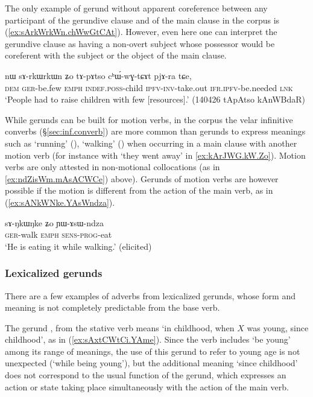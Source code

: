 The only example of gerund without apparent coreference between any participant of the gerundive clause and of the main clause in the corpus is (\ref{ex:sArkWrkWn.chWwGtCAt}). However, even here one can interpret the gerundive clause as having a non-overt subject whose possessor would be coreferent with the subject or the object of the main clause.

\begin{exe}
\ex \label{ex:sArkWrkWn.chWwGtCAt}
\gll nɯ sɤ-rkɯ\redp{}rkɯn ʑo tɤ-pɤtso cʰɯ́-wɣ-tɕɤt pjɤ-ra tɕe, \\
\textsc{dem} \textsc{ger}-be.few \textsc{emph} \textsc{indef}.\textsc{poss}-child \textsc{ipfv}-\textsc{inv}-take.out \textsc{ifr}.\textsc{ipfv}-be.needed \textsc{lnk} \\ 
\glt `People had to raise children with few [resources].' (140426 tApAtso kAnWBdaR)
\end{exe}

While gerunds can be built for motion verbs, in the corpus the velar infinitive converbs  (§\ref{sec:inf.converb}) are more common than gerunds to express meanings such as `running' (), `walking' () when occurring in a main clause with another motion verb (for instance with  `they went away' in \ref{ex:kArJWG.kW.Zo}). Motion verbs are only attested in non-motional collocations (as in \ref{ex:ndZisWm.mAsACWCe}) above). Gerunds of motion verbs are however possible if the motion is different from the action of the main verb, as in (\ref{ex:sANkWNke.YAsWndza}).

\begin{exe}
\ex \label{ex:sANkWNke.YAsWndza}
\gll sɤ-ŋkɯ\redp{}ŋke ʑo ɲɯ-ɤsɯ-ndza \\
\textsc{ger}-walk \textsc{emph} \textsc{sens}-\textsc{prog}-eat \\
\glt `He is eating it while walking.' (elicited)
\end{exe}

\subsubsection{Lexicalized gerunds}  \label{sec:gerund.lexicalized}
There are a few examples of adverbs from lexicalized gerunds, whose form and meaning is not completely predictable from the base verb.

The gerund , from the stative verb  means `in childhood, when $X$ was young, since childhood', as in (\ref{ex:sAxtCWtCi.YAme}). Since the verb  includes `be young' among its range of meanings, the use of this gerund to refer to young age is not unexpected (`while being young'), but the additional meaning `since  childhood' does not correspond to the usual function of the gerund, which expresses an action or state taking place simultaneously with the action of the main verb.

